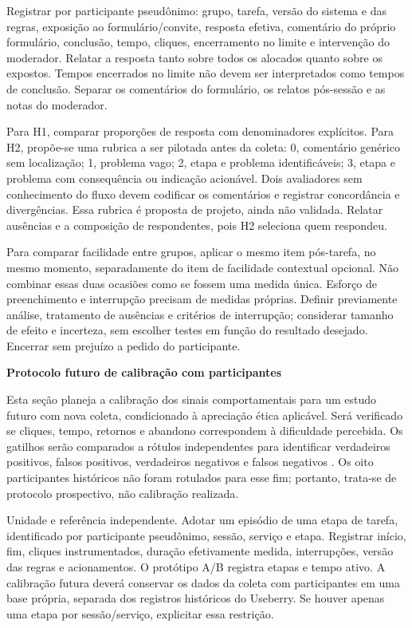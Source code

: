 \begin{apendicesenv}
Registrar por participante pseudônimo: grupo, tarefa, versão do sistema e das regras, exposição ao formulário/convite, resposta efetiva, comentário do próprio formulário, conclusão, tempo, cliques, encerramento no limite e intervenção do moderador. Relatar a resposta tanto sobre todos os alocados quanto sobre os expostos. Tempos encerrados no limite não devem ser interpretados como tempos de conclusão. Separar os comentários do formulário, os relatos pós-sessão e as notas do moderador.

Para H1, comparar proporções de resposta com denominadores explícitos. Para H2, propõe-se uma rubrica a ser pilotada antes da coleta: 0, comentário genérico sem localização; 1, problema vago; 2, etapa e problema identificáveis; 3, etapa e problema com consequência ou indicação acionável. Dois avaliadores sem conhecimento do fluxo devem codificar os comentários e registrar concordância e divergências. Essa rubrica é proposta de projeto, ainda não validada. Relatar ausências e a composição de respondentes, pois H2 seleciona quem respondeu.

Para comparar facilidade entre grupos, aplicar o mesmo item pós-tarefa, no mesmo momento, separadamente do item de facilidade contextual opcional. Não combinar essas duas ocasiões como se fossem uma medida única. Esforço de preenchimento e interrupção precisam de medidas próprias. Definir previamente análise, tratamento de ausências e critérios de interrupção; considerar tamanho de efeito e incerteza, sem escolher testes em função do resultado desejado. Encerrar sem prejuízo a pedido do participante.

\textbf{Protocolo futuro de calibração com participantes}

Esta seção planeja a calibração dos sinais comportamentais para um estudo futuro com nova coleta, condicionado à apreciação ética aplicável. Será verificado se cliques, tempo, retornos e abandono correspondem à dificuldade percebida. Os gatilhos serão comparados a rótulos independentes para identificar verdadeiros positivos, falsos positivos, verdadeiros negativos e falsos negativos \cite{fawcett2006}. Os oito participantes históricos não foram rotulados para esse fim; portanto, trata-se de protocolo prospectivo, não calibração realizada.

Unidade e referência independente. Adotar um episódio de uma etapa de tarefa, identificado por participante pseudônimo, sessão, serviço e etapa. Registrar início, fim, cliques instrumentados, duração efetivamente medida, interrupções, versão das regras e acionamentos. O protótipo A/B registra etapas e tempo ativo. A calibração futura deverá conservar os dados da coleta com participantes em uma base própria, separada dos registros históricos do Useberry. Se houver apenas uma etapa por sessão/serviço, explicitar essa restrição.


\end{apendicesenv}

